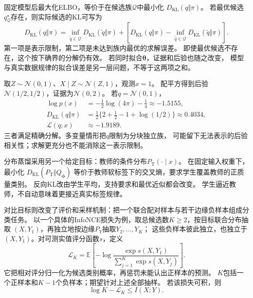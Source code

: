 固定模型后最大化ELBO，等价于在候选族\(\mathcal Q\)中最小化
\(D_{\mathrm{KL}}(q\Vert\pi)\)。
若最优候选\(q^\star_{\mathcal Q}\)存在，则实际候选的KL可写为
\[
  D_{\mathrm{KL}}(q\Vert\pi)
  =\inf_{\widetilde q\in\mathcal Q}D_{\mathrm{KL}}(\widetilde q\Vert\pi)
   +\left[D_{\mathrm{KL}}(q\Vert\pi)
    -\inf_{\widetilde q\in\mathcal Q}D_{\mathrm{KL}}(\widetilde q\Vert\pi)\right].
\]
第一项是表示限制，第二项是未达到族内最优的求解误差。
即使最优候选不存在，这个按下确界的分解仍有效。
若同时拟合\(\bm\theta\)，证据和后验也随之改变，
模型与真实数据规律的拟合误差是另一层问题，不等于这两项之和。

取\(Z\sim\mathcal N(0,1)\)、\(X\mid Z\sim\mathcal N(Z,1)\)，观测\(x=1\)。
配平方得到后验\(\mathcal N(1/2,1/2)\)，证据为\(\mathcal N(0,2)\)。
若\(q=\mathcal N(0,1)\)，
\[
\begin{aligned}
  \log p(x)&=-\tfrac12\log(4\pi)-\tfrac14\approx-1.5155,\\
  D_{\mathrm{KL}}(q\Vert\pi)
  &=\tfrac12\{2+\tfrac12-1+\log(1/2)\}\approx0.4034,\\
  \mathcal L(q;x)&\approx-1.9189.
\end{aligned}
\]
三者满足精确分解。多变量情形把\(q\)限制为分块独立族，
可能留下无法表示的后验相关性；求解更充分也不能消除这一表示限制。

分布蒸馏采用另一个给定目标：教师的条件分布\(P_{\mathrm T}(\cdot\mid x)\)。
在固定输入权重下，最小化
\(D_{\mathrm{KL}}(P_{\mathrm T}\Vert Q_{\bm\phi})\)
等价于教师软标签下的交叉熵，要求学生覆盖教师的正质量类别。
反向KL改由学生平均，支持要求和最优近似都会改变。
学生逼近教师，不自动意味着更接近真实标签规律。

对比目标则改变了评价和采样机制：把一个联合配对样本与若干边缘负样本组成分类任务。
以一个具体的InfoNCE损失为例，取总候选数\(K\geq2\)，按目标联合分布抽取
\((X,Y_1)\)，再独立地按边缘\(P_Y\)抽取\(Y_2,\ldots,Y_K\)；
这些负样本彼此独立，也独立于\((X,Y_1)\)。对可测实值评分函数\(s\)，定义
\begin{equation}
 \mathcal L_K
 =\mathbb E\left[-\log
   \frac{\exp s(X,Y_1)}{\sum_{j=1}^K\exp s(X,Y_j)}\right].
 \label{eq:information-contrastive-loss}
\end{equation}
它把相对评分归一化为候选类别概率，再惩罚未能认出正样本的预测。
\(K\)包括一个正样本和\(K-1\)个负样本；期望针对上述全部抽样。
若该损失可积，则
\[
 \log K-\mathcal L_K\leq I(X;Y).
\]

